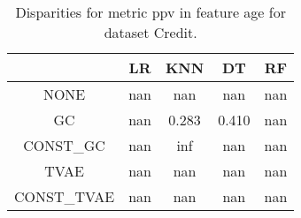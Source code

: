 \begin{table}
\caption{Disparities for metric ppv in feature age for dataset Credit.}
\label{tab:disp-CREDIT-age-ppv}
\begin{tabular}{ccccc}
\toprule
 & LR & KNN & DT & RF \\
\midrule
NONE & nan & nan & nan & nan \\
GC & nan & 0.283 & 0.410 & nan \\
CONST\_GC & nan & inf & nan & nan \\
TVAE & nan & nan & nan & nan \\
CONST\_TVAE & nan & nan & nan & nan \\
\bottomrule
\end{tabular}
\end{table}
